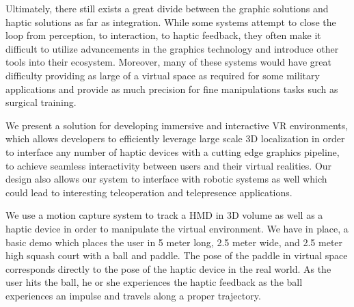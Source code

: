 Ultimately, there still exists a great divide between the graphic solutions and
haptic solutions as far as integration. While some systems attempt to close the
loop from perception, to interaction, to haptic feedback, they often make it
difficult to utilize advancements in the graphics technology and introduce
other tools into their ecosystem.  Moreover, many of these systems would have
great difficulty providing as large of a virtual space as required for some
military applications and provide as much precision for fine manipulations
tasks such as surgical training.

We present a solution for developing immersive and interactive VR environments,
which allows developers to efficiently leverage large scale 3D localization in
order to interface any number of haptic devices with a cutting edge graphics
pipeline, to achieve seamless interactivity between users and their virtual
realities. Our design also allows our system to interface with robotic systems
as well which could lead to interesting teleoperation and telepresence
applications.

We use a motion capture system to track a HMD in 3D volume as well as a haptic
device in order to manipulate the virtual environment. We have in place, a
basic demo which places the user in 5 meter long, 2.5 meter wide, and 2.5 meter
high squash court with a ball and paddle.  The pose of the paddle in virtual
space corresponds directly to the pose of the haptic device in the real world.
As the user hits the ball, he or she experiences the haptic feedback as the
ball experiences an impulse and travels along a proper trajectory.

